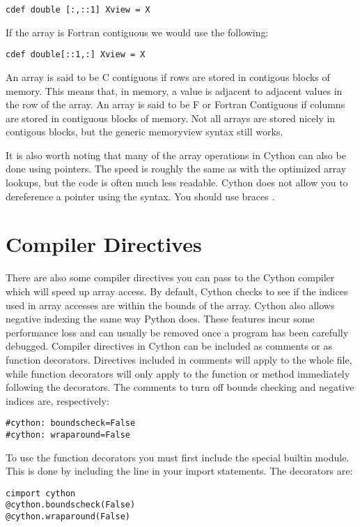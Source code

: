 \begin{lstlisting}
cdef double [:,::1] Xview = X
\end{lstlisting}

If the array is Fortran contiguous we would use the following:

\begin{lstlisting}
cdef double[::1,:] Xview = X
\end{lstlisting}

An array is said to be C contiguous if rows are stored in contigous blocks of memory.
This means that, in memory, a value is adjacent to adjacent values in the row of the array.
An array is said to be F or Fortran Contiguous if columns are stored in contiguous blocks of memory.
Not all arrays are stored nicely in contigous blocks, but the generic memoryview syntax still works.

It is also worth noting that many of the array operations in Cython can also be done using pointers.
The speed is roughly the same as with the optimized array lookups, but the code is often much less readable.
Cython does not allow you to dereference a pointer using the \li{*} syntax.
You should use braces \li{[ ]}.

\section*{Compiler Directives}

There are also some compiler directives you can pass to the Cython compiler which will speed up array access.
By default, Cython checks to see if the indices used in array accesses are within the bounds of the array.
Cython also allows negative indexing the same way Python does.
These features incur some performance loss and can usually be removed once a program has been carefully debugged.
Compiler directives in Cython can be included as comments or as function decorators.
Directives included in comments will apply to the whole file, while function decorators will only apply to the function or method immediately following the decorators.
The comments to turn off bounds checking and negative indices are, respectively:
\begin{lstlisting}
#cython: boundscheck=False
#cython: wraparound=False
\end{lstlisting}

To use the function decorators you must first include the special builtin  module.
This is done by including the line  in your import statements.
The decorators are:
\begin{lstlisting}
cimport cython
@cython.boundscheck(False)
@cython.wraparound(False)
\end{lstlisting}

